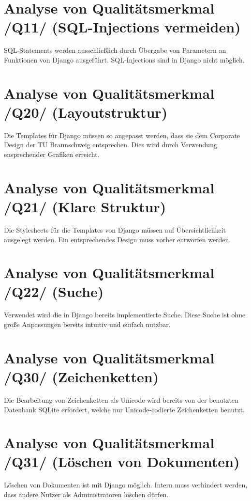 \section{Analyse von Qualitätsmerkmal /Q11/ (SQL-Injections vermeiden)}
SQL-Statements werden ausschließlich durch Übergabe von Parametern an Funktionen von Django ausgeführt. SQL-Injections sind in Django nicht möglich.
\section{Analyse von Qualitätsmerkmal /Q20/ (Layoutstruktur)}
Die Templates für Django müssen so angepasst werden, dass sie dem Corporate Design der TU Braunschweig entsprechen. Dies wird durch Verwendung ensprechender Grafiken erreicht.
\section{Analyse von Qualitätsmerkmal /Q21/ (Klare Struktur)}
Die Stylesheets für die Templates von Django müssen auf Übersichtlichkeit ausgelegt werden. Ein entsprechendes Design muss vorher entworfen werden.
\section{Analyse von Qualitätsmerkmal /Q22/ (Suche)}
Verwendet wird die in Django bereits implementierte Suche. Diese Suche ist ohne große Anpassungen bereits intuitiv und einfach nutzbar.
\section{Analyse von Qualitätsmerkmal /Q30/ (Zeichenketten)}
Die Bearbeitung von Zeichenketten als Unicode wird bereits von der benutzten Datenbank SQLite erfordert, welche nur Unicode-codierte Zeichenketten benutzt.
\section{Analyse von Qualitätsmerkmal /Q31/ (Löschen von Dokumenten)}
Löschen von Dokumenten ist mit Django möglich. Intern muss verhindert werden, dass andere Nutzer als Administratoren löschen dürfen.
